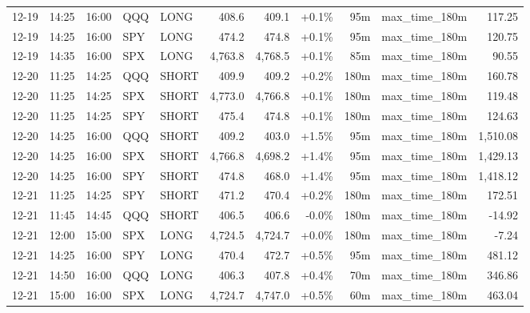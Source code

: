 \documentclass[11pt,a4paper,twoside]{article}
\begin{document}
\begin{center}
\begin{longtable}{>{\color{txtmain}}l l l l l r r r r >{\color{txtmain}}l r}
12-19 & 14:25 & 16:00 & QQQ & LONG & 408.6 & 409.1 & \textcolor{wingreen}{+0.1\%} & 95m & max\_time\_180m & \textcolor{wingreen}{117.25} \\
12-19 & 14:25 & 16:00 & SPY & LONG & 474.2 & 474.8 & \textcolor{wingreen}{+0.1\%} & 95m & max\_time\_180m & \textcolor{wingreen}{120.75} \\
12-19 & 14:35 & 16:00 & SPX & LONG & 4,763.8 & 4,768.5 & \textcolor{wingreen}{+0.1\%} & 85m & max\_time\_180m & \textcolor{wingreen}{90.55} \\
12-20 & 11:25 & 14:25 & QQQ & SHORT & 409.9 & 409.2 & \textcolor{wingreen}{+0.2\%} & 180m & max\_time\_180m & \textcolor{wingreen}{160.78} \\
12-20 & 11:25 & 14:25 & SPX & SHORT & 4,773.0 & 4,766.8 & \textcolor{wingreen}{+0.1\%} & 180m & max\_time\_180m & \textcolor{wingreen}{119.48} \\
12-20 & 11:25 & 14:25 & SPY & SHORT & 475.4 & 474.8 & \textcolor{wingreen}{+0.1\%} & 180m & max\_time\_180m & \textcolor{wingreen}{124.63} \\
12-20 & 14:25 & 16:00 & QQQ & SHORT & 409.2 & 403.0 & \textcolor{wingreen}{+1.5\%} & 95m & max\_time\_180m & \textcolor{wingreen}{1,510.08} \\
12-20 & 14:25 & 16:00 & SPX & SHORT & 4,766.8 & 4,698.2 & \textcolor{wingreen}{+1.4\%} & 95m & max\_time\_180m & \textcolor{wingreen}{1,429.13} \\
12-20 & 14:25 & 16:00 & SPY & SHORT & 474.8 & 468.0 & \textcolor{wingreen}{+1.4\%} & 95m & max\_time\_180m & \textcolor{wingreen}{1,418.12} \\
12-21 & 11:25 & 14:25 & SPY & SHORT & 471.2 & 470.4 & \textcolor{wingreen}{+0.2\%} & 180m & max\_time\_180m & \textcolor{wingreen}{172.51} \\
12-21 & 11:45 & 14:45 & QQQ & SHORT & 406.5 & 406.6 & \textcolor{lossred}{-0.0\%} & 180m & max\_time\_180m & \textcolor{lossred}{-14.92} \\
12-21 & 12:00 & 15:00 & SPX & LONG & 4,724.5 & 4,724.7 & \textcolor{wingreen}{+0.0\%} & 180m & max\_time\_180m & \textcolor{lossred}{-7.24} \\
12-21 & 14:25 & 16:00 & SPY & LONG & 470.4 & 472.7 & \textcolor{wingreen}{+0.5\%} & 95m & max\_time\_180m & \textcolor{wingreen}{481.12} \\
12-21 & 14:50 & 16:00 & QQQ & LONG & 406.3 & 407.8 & \textcolor{wingreen}{+0.4\%} & 70m & max\_time\_180m & \textcolor{wingreen}{346.86} \\
12-21 & 15:00 & 16:00 & SPX & LONG & 4,724.7 & 4,747.0 & \textcolor{wingreen}{+0.5\%} & 60m & max\_time\_180m & \textcolor{wingreen}{463.04} \\

\end{longtable}
\end{center}
\end{document}
